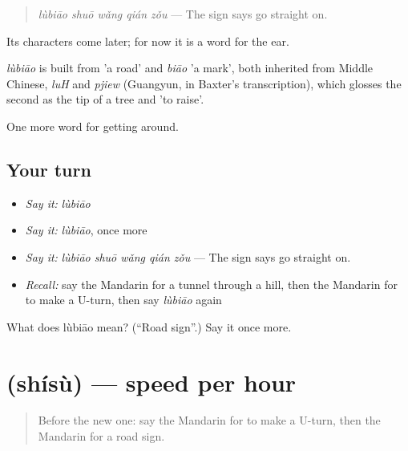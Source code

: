 \begin{quote}
\emph{lùbiāo shuō wǎng qián zǒu} — The sign says go straight on.
\end{quote}

Its characters come later; for now it is a word for the ear.

\begin{cousinweb}
\emph{lùbiāo} is built from  'a road' and \emph{biāo} 'a mark', both inherited from Middle Chinese, \emph{luH} and \emph{pjiew} (Guangyun, in Baxter's transcription), which glosses the second as the tip of a tree and 'to raise'.
\end{cousinweb}

\begin{grammarlens}[title={What you've built}]
One more word for getting around.
\end{grammarlens}

\subsection*{Your turn}
\begin{itemize}
\raggedright
  \item \emph{Say it:} \emph{lùbiāo}
  \item \emph{Say it:} \emph{lùbiāo}, once more
  \item \emph{Say it:} \emph{lùbiāo shuō wǎng qián zǒu} — The sign says go straight on.
  \item \emph{Recall:} say the Mandarin for a tunnel through a hill, then the Mandarin for to make a U-turn, then say \emph{lùbiāo} again
\end{itemize}

\begin{tcolorbox}[breakable,colback=teal!4,colframe=teal!35!black,title={Before you move on}]
What does lùbiāo mean? (\textquotedblleft{}Road sign\textquotedblright{}.) Say it once more.
\end{tcolorbox}
\section[\texorpdfstring{\zh{时速} (shísù)}{时速 (shísù)}]{ (shísù) — speed per hour}

\label{lesson:ZH-C424-shisu}



\begin{quote}
Before the new one: say the Mandarin for to make a U-turn, then the Mandarin for a road sign.
\end{quote}

